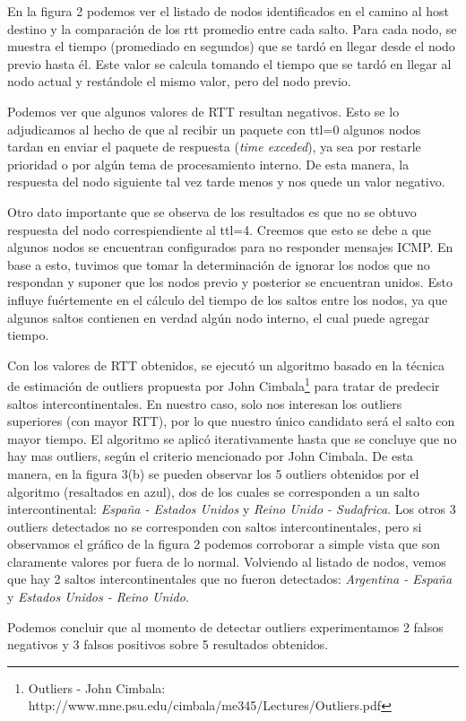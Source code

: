 \par En la figura 2 podemos ver el listado de nodos identificados en el camino al host destino y la comparación de los rtt promedio entre cada salto. Para cada nodo, se muestra el tiempo (promediado en segundos) que se tardó en llegar desde el nodo previo hasta él. Este valor se calcula tomando el tiempo que se tardó en llegar al nodo actual y restándole el mismo valor, pero del nodo previo.
\par Podemos ver que algunos valores de RTT resultan negativos. Esto se lo adjudicamos al hecho de que al recibir un paquete con ttl=0 algunos nodos tardan en enviar el paquete de respuesta (\textit{time exceded}), ya sea por restarle prioridad o por algún tema de procesamiento interno. De esta manera, la respuesta del nodo siguiente tal vez tarde menos y nos quede un valor negativo.
\par Otro dato importante que se observa de los resultados es que no se obtuvo respuesta del nodo correspiendiente al ttl=4. Creemos que esto se debe a que algunos nodos se encuentran configurados para no responder mensajes ICMP. En base a esto, tuvimos que tomar la determinación de ignorar los nodos que no respondan y suponer que los nodos previo y posterior se encuentran unidos. Esto influye fuértemente en el cálculo del tiempo de los saltos entre los nodos, ya que algunos saltos contienen en verdad algún nodo interno, el cual puede agregar tiempo.
\par Con los valores de RTT obtenidos, se ejecutó un algoritmo basado en la técnica de estimación de outliers propuesta por John Cimbala\footnote{Outliers - John Cimbala: http://www.mne.psu.edu/cimbala/me345/Lectures/Outliers.pdf} para tratar de predecir saltos intercontinentales. En nuestro caso, solo nos interesan los outliers superiores (con mayor RTT), por lo que nuestro único candidato será el salto con mayor tiempo. El algoritmo se aplicó iterativamente hasta que se concluye que no hay mas outliers, según el criterio mencionado por John Cimbala. De esta manera, en la figura 3(b) se pueden observar los 5 outliers obtenidos por el algoritmo (resaltados en azul), dos de los cuales se corresponden a un salto intercontinental: \textit{España - Estados Unidos} y \textit{Reino Unido - Sudafrica}. Los otros 3 outliers detectados no se corresponden con saltos intercontinentales, pero si observamos el gráfico de la figura 2 podemos corroborar a simple vista que son claramente valores por fuera de lo normal. Volviendo al listado de nodos, vemos que hay 2 saltos intercontinentales que no fueron detectados: \textit{Argentina - España} y \textit{Estados Unidos - Reino Unido}.
\par Podemos concluir que al momento de detectar outliers experimentamos 2 falsos negativos y 3 falsos positivos sobre 5 resultados obtenidos.
